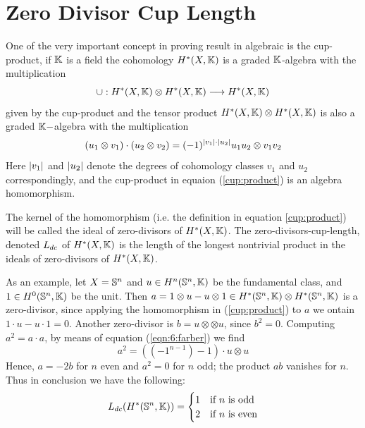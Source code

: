 \section{Zero Divisor Cup Length}

One of the very important concept in proving result in algebraic is the cup-product, if $\mathbb{K}$ is a field the cohomology $H^*(X, \mathbb{K})$ is a graded $\mathbb{K}$-algebra with the multiplication
\begin{equation}\label{cup:product}
    \cup: H^*(X, \mathbb{K}) \otimes H^*(X, \mathbb{K}) \longrightarrow H^*(X, \mathbb{K})
\end{equation}
given by the cup-product and the tensor product $H^*(X, \mathbb{K}) \otimes H^*(X, \mathbb{K})$ is also a graded $\mathbb{K}-$algebra with the multiplication
\begin{equation}\label{eqn:6:farber}
    (u_1 \otimes v_1) \cdot (u_2 \otimes v_2) = (-1)^{\lvert v_1\rvert \cdot \lvert u_2\rvert} u_1 u_2 \otimes v_1v_2
\end{equation}
Here $\lvert v_1\rvert$ and $\lvert u_2\rvert$ denote the degrees of cohomology classes $v_1$ and $u_2$ correspondingly, and the cup-product in equaion (\ref{cup:product}) is an algebra homomorphism.

\begin{defn}
    The kernel of the homomorphism (i.e. the definition in equation \ref{cup:product}) will be called the ideal of zero-divisors of $H^*(X, \mathbb{K})$.
    The zero-divisors-cup-length, denoted $L_{dc}$ of $H^*(X, \mathbb{K})$ is the length of the longest nontrivial product in the ideals of zero-divisors of $H^*(X, \mathbb{K})$.
\end{defn}
As an example, let $X = \mathbb{S}^n$ and $u \in H^n(\mathbb{S}^n, \mathbb{K})$ be the fundamental class, and $1 \in H^0(\mathbb{S}^n, \mathbb{K})$ be the unit. Then $a = 1 \otimes u - u \otimes 1 \in H^*(\mathbb{S}^n, \mathbb{K}) \otimes H^*(\mathbb{S}^n, \mathbb{K})$ is a zero-divisor, since applying the homomorphism in (\ref{cup:product}) to $a$ we ontain $1 \cdot u - u\cdot 1 = 0$. Another zero-divisor is $b = u \otimes \otimes u$, since $b^2 = 0$. Computing $a^2 = a \cdot a$, by means of equation (\ref{eqn:6:farber}) we find
\[
    a^2 = \left((-1^{n-1}) - 1\right) \cdot u \otimes u
\]
Hence, $a = - 2b$ for $n$ even and $a^2 = 0$ for $n$ odd; the product $ab$ vanishes for $n$. Thus in conclusion we have the following:
\begin{equation}\label{zdcl:of:sphere}
    L_{dc}(H^*(\mathbb{S}^n, \mathbb{K})) = \begin{cases}
        1 & \text{if $n$ is odd}  \\
        2 & \text{if $n$ is even}
    \end{cases}
\end{equation}



